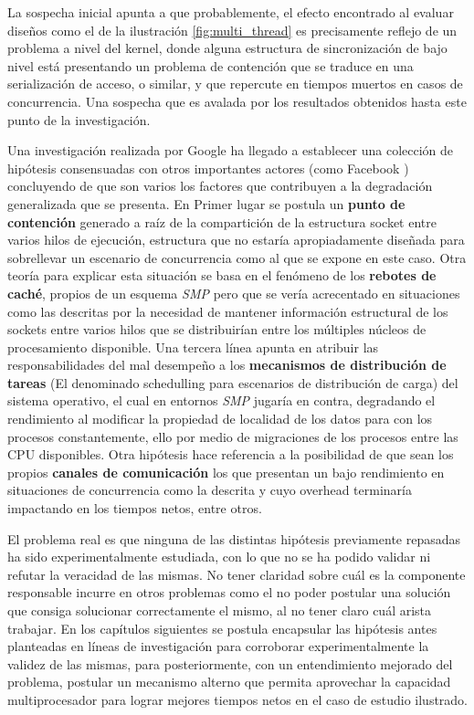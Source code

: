 La sospecha inicial apunta a que probablemente, el efecto encontrado al evaluar diseños como el de la ilustración \ref{fig:multi_thread} es precisamente reflejo de un problema a nivel del kernel, donde alguna estructura de sincronización de bajo nivel está presentando un problema de contención que se traduce en una serialización de acceso, o similar, y que repercute en tiempos muertos en casos de concurrencia. Una sospecha que es avalada por los resultados obtenidos hasta este punto de la investigación.

Una investigación realizada por Google \cite{slides:googleReuseport} ha llegado a establecer una colección de hipótesis consensuadas con otros importantes actores (como Facebook \cite{post:facebook}) concluyendo de que son varios los factores que contribuyen a la degradación generalizada que se presenta. En Primer lugar se postula un \textbf{punto de contención} generado a raíz de la compartición de la estructura socket entre varios hilos de ejecución, estructura que no estaría apropiadamente diseñada para sobrellevar un escenario de concurrencia como al que se expone en este caso. Otra teoría para explicar esta situación se basa en el fenómeno de los \textbf{rebotes de caché}, propios de un esquema \emph{SMP} pero que se vería acrecentado en situaciones como las descritas por la necesidad de mantener información estructural de los sockets entre varios hilos que se distribuirían entre los múltiples núcleos de procesamiento disponible. Una tercera línea apunta en atribuir las responsabilidades del mal desempeño a los \textbf{mecanismos de distribución de tareas} (El denominado schedulling para escenarios de distribución de carga) del sistema operativo, el cual en entornos \emph{SMP} jugaría en contra, degradando el rendimiento al modificar la propiedad de localidad de los datos para con los procesos constantemente, ello por medio de migraciones de los procesos entre las CPU disponibles. Otra hipótesis hace referencia a la posibilidad de que sean los propios \textbf{canales de comunicación} los que presentan un bajo rendimiento en situaciones de concurrencia como la descrita y cuyo overhead terminaría impactando en los tiempos netos, entre otros.

El problema real es que ninguna de las distintas hipótesis previamente repasadas ha sido experimentalmente estudiada, con lo que no se ha podido validar ni refutar la veracidad de las mismas. No tener claridad sobre cuál es la componente responsable incurre en otros problemas como el no poder postular una solución que consiga solucionar correctamente el mismo, al no tener claro cuál arista trabajar. En los capítulos siguientes se postula encapsular las hipótesis antes planteadas en líneas de investigación para corroborar experimentalmente la validez de las mismas, para posteriormente, con un entendimiento mejorado del problema, postular un mecanismo alterno que permita aprovechar la capacidad multiprocesador para lograr mejores tiempos netos en el caso de estudio ilustrado.

